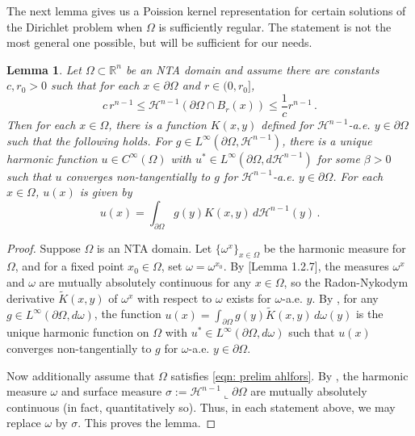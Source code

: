 \documentclass[10pt, reqno]{amsart}
\numberwithin{equation}{section}
\newtheorem{lemma}[theorem]{Lemma}
\def\R{{\mathbb R}}
\def\w{\omega}
\def\W{\Omega}
\def\om{\omega}
\def\pa{{\partial}}
\begin{document}
The next lemma gives us a Poission kernel representation for certain solutions of the Dirichlet problem when $\W$ is sufficiently regular. The statement is not the most general one possible, but will be sufficient for our needs.
\begin{lemma}\label{lem: poisson kernel}
    Let $\W \subset \R^n$ be an NTA domain and assume there are  constants $c,r_0 >0$ such that for each $x \in \partial \W$ and $r\in (0,r_0]$,
\begin{equation}\label{eqn: prelim ahlfors}
   c \, r^{n-1} \leq   \mathcal{H}^{n-1} (\partial \W \cap B_r(x) ) \leq \frac{1}{c} r^{n-1}\,.
\end{equation}
Then for each $x \in \W$, there is a function $K(x,y)$ defined  for $\mathcal{H}^{n-1}$-a.e. $y \in \partial \W$ such that the following holds. 
%
For $g\in L^\infty(\partial \W,  \mathcal{H}^{n-1})$, there is a unique harmonic function $u \in C^\infty(\W)$ with $u^* \in L^\infty(\partial \W, d\mathcal{H}^{n-1})$ for some $\beta>0$ such that $u$ converges non-tangentially to $g$ for $\mathcal{H}^{n-1}$-a.e. $y \in \partial \W$. For each $x \in \W$, $u(x)$ is given by
$$
u(x) = \int_{\partial \W} g(y){K}(x,y) \, d \mathcal{H}^{n-1}(y)\,.
$$
\end{lemma}
\begin{proof}
Suppose $\W$ is an NTA domain. Let $\{\w^x\}_{x\in \W}$ be the harmonic measure for $\W$, and for a fixed point $x_0 \in \W$, set $\w= \w^{x_0}$. By [Lemma 1.2.7]\cite{k94}, the measures $\w^x$ and $\w$ are mutually absolutely continuous for any $x \in \W$, so 
the Radon-Nykodym  derivative $\tilde{K}(x,y)$ of $\w^x$ with respect to $\w$
 exists for $\w$-a.e. $y$. By \cite[Corollary 1.4.3, Theorem 1.4.4]{k94}, for any $g \in  L^\infty(\pa \W, d \om)$, the function 
$u(x) = \int_{\partial \W} g(y)\tilde{K}(x,y) \, d\om(y)$
is the unique harmonic function on $\W$ with $u^* \in L^\infty(\partial \W, d\om)$ such that  $u(x)$ converges non-tangentially to $g$ for $\om$-a.e. $y \in \partial \W$. 

Now additionally assume that $\W$ satisfies \eqref{eqn: prelim ahlfors}. By \cite[Theorem 2]{DavidJerison}, the harmonic measure $\w$ and surface measure $\sigma:= \mathcal{H}^{n-1}\llcorner \partial \W$ are mutually absolutely continuous (in fact, quantitatively so). Thus, in each statement above, we may replace $\om$ by $\sigma$. This proves the lemma.
\end{proof}
\end{document}
